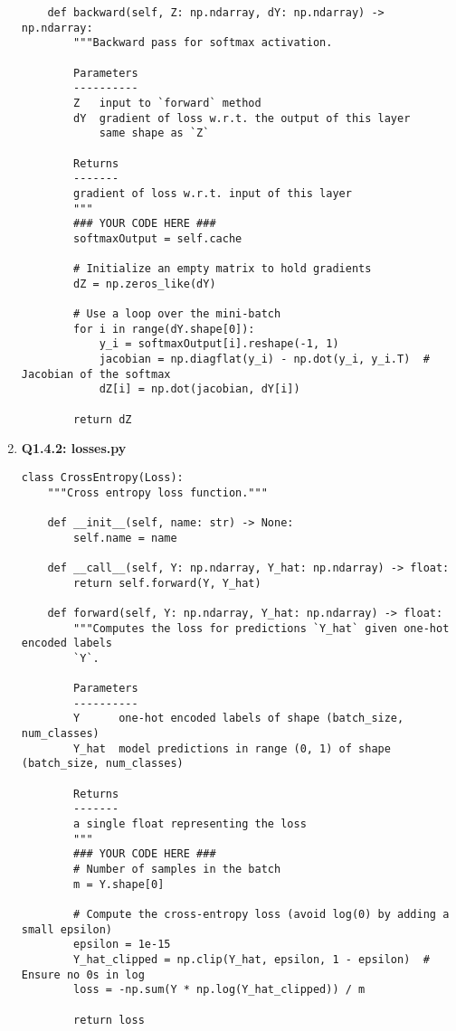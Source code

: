 \documentclass{article}
\begin{document}
\begin{enumerate}
\begin{verbatim}
    def backward(self, Z: np.ndarray, dY: np.ndarray) -> np.ndarray:
        """Backward pass for softmax activation.
        
        Parameters
        ----------
        Z   input to `forward` method
        dY  gradient of loss w.r.t. the output of this layer
            same shape as `Z`

        Returns
        -------
        gradient of loss w.r.t. input of this layer
        """
        ### YOUR CODE HERE ###
        softmaxOutput = self.cache

        # Initialize an empty matrix to hold gradients
        dZ = np.zeros_like(dY)

        # Use a loop over the mini-batch
        for i in range(dY.shape[0]):
            y_i = softmaxOutput[i].reshape(-1, 1)
            jacobian = np.diagflat(y_i) - np.dot(y_i, y_i.T)  # Jacobian of the softmax
            dZ[i] = np.dot(jacobian, dY[i])

        return dZ
\end{verbatim}\newpage

    \item 
     \textbf{Q1.4.2: losses.py}
\begin{verbatim}
class CrossEntropy(Loss):
    """Cross entropy loss function."""

    def __init__(self, name: str) -> None:
        self.name = name

    def __call__(self, Y: np.ndarray, Y_hat: np.ndarray) -> float:
        return self.forward(Y, Y_hat)

    def forward(self, Y: np.ndarray, Y_hat: np.ndarray) -> float:
        """Computes the loss for predictions `Y_hat` given one-hot encoded labels
        `Y`.

        Parameters
        ----------
        Y      one-hot encoded labels of shape (batch_size, num_classes)
        Y_hat  model predictions in range (0, 1) of shape (batch_size, num_classes)

        Returns
        -------
        a single float representing the loss
        """
        ### YOUR CODE HERE ###
        # Number of samples in the batch
        m = Y.shape[0]

        # Compute the cross-entropy loss (avoid log(0) by adding a small epsilon)
        epsilon = 1e-15
        Y_hat_clipped = np.clip(Y_hat, epsilon, 1 - epsilon)  # Ensure no 0s in log
        loss = -np.sum(Y * np.log(Y_hat_clipped)) / m

        return loss


\end{verbatim}
\end{enumerate}
\end{document}
